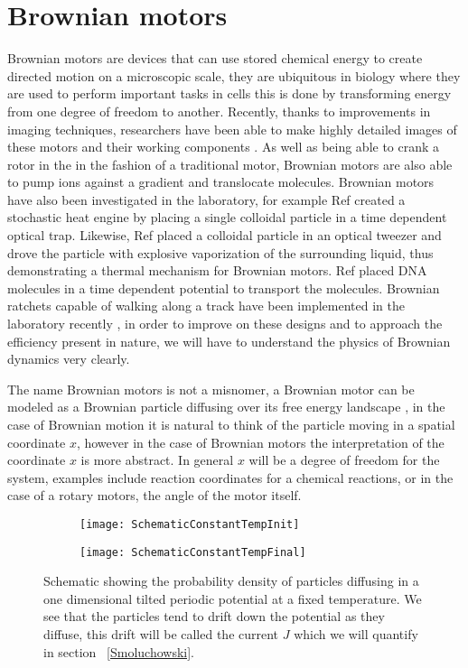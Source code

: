 \section{Brownian motors}
Brownian motors are devices that can use stored chemical energy to create directed motion on a microscopic scale, they are ubiquitous in biology where they are used to perform important tasks in cells  \cite{PhillipsQuakeMay2006, Magnasco1994} this is done by transforming energy from one degree of freedom to another. Recently, thanks to improvements in imaging techniques, researchers have been able to make highly detailed images of these motors and their working components \cite{YiWeiChang2016}. As well as being able to crank a rotor in the in the fashion of a traditional motor, Brownian motors are also able to pump ions against a gradient and translocate molecules\cite{Magnasco1994, Reimann2001, Leibler1993, leibler1990physical}. Brownian motors have also been investigated in the laboratory, for example Ref \cite{BlickleBechinger2011} created a stochastic heat engine by placing a single colloidal particle in a time dependent optical trap. Likewise, Ref \cite{Pedro2014} placed a colloidal particle in an optical tweezer and drove the particle with explosive vaporization of the surrounding liquid, thus demonstrating a thermal mechanism for Brownian motors. Ref \cite{JoelBader1999} placed DNA molecules in a time dependent potential to transport the molecules. Brownian ratchets capable of walking along a track have been implemented in the laboratory recently \cite{Wang2010,DeliusGeertsemaLeigh2010,DeliusGeertsemaLeighEtAl2010}, in order to improve on these designs and to approach the efficiency present in nature, we will have to understand the physics of Brownian dynamics very clearly.

The name Brownian motors is not a misnomer, a Brownian motor can be modeled as a Brownian particle diffusing over its free energy landscape \cite{Reimann2001}, in the case of Brownian motion it is natural to think of the particle moving in a spatial coordinate $x$, however in the case of Brownian motors the interpretation of the coordinate $x$ is more abstract. In general $x$ will be a degree of freedom for the system, examples include reaction coordinates for a chemical reactions, or in the case of a rotary motors, the angle of the motor itself.

\begin{figure}[tb]
	\begin{subfigure}{0.49\textwidth}
		\texttt{[image: SchematicConstantTempInit]}
		\caption{\label{fig:Init}}
	\end{subfigure}
\begin{subfigure}{0.49\textwidth}
		\texttt{[image: SchematicConstantTempFinal]}
		\caption{\label{fig:Final}}
\end{subfigure}
\caption{Schematic showing the probability density of particles diffusing in a one dimensional tilted periodic potential at a fixed temperature. We see that the particles tend to drift down the potential as they diffuse, this drift will be called the current $J$ which we will quantify in section ~\autoref{Smoluchowski}.}
\label{fig:Schematic}
\end{figure}

